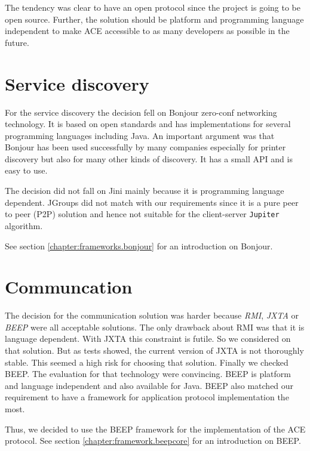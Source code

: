 The tendency was clear to have an open protocol since the project is going to be open source. Further, the solution should be platform and programming language independent to make ACE accessible to as many developers as possible in the future.

\section{Service discovery}
For the service discovery the decision fell on Bonjour zero-conf networking technology. It is based on open standards and has implementations for several programming languages including Java. An important argument was that Bonjour has been used successfully by many companies especially for printer discovery but also for many other kinds of discovery. It has a small API and is easy to use. 

The decision did not fall on Jini mainly because it is programming language dependent. JGroups did not match with our requirements since it is a pure peer to peer (P2P) solution and hence not suitable for the client-server \texttt{Jupiter} algorithm.

See section \ref{chapter:frameworks.bonjour} for an introduction on  Bonjour.

\section{Communcation}
The decision for the communication solution was harder because \emph{RMI}, \emph{JXTA} or \emph{BEEP} were all acceptable solutions. The only drawback about RMI was that it is language dependent. With JXTA this constraint is futile. So we considered on that solution. But as tests showed, the current version of JXTA is not thoroughly stable. This seemed a high risk for choosing that solution. Finally we checked BEEP. The evaluation for that technology were convincing. BEEP is platform and language independent and also available for Java. BEEP also matched our requirement to have a framework for application protocol implementation the most.

Thus, we decided to use the BEEP framework for the implementation of the ACE protocol. See section \ref{chapter:framework.beepcore} for an introduction on BEEP.

